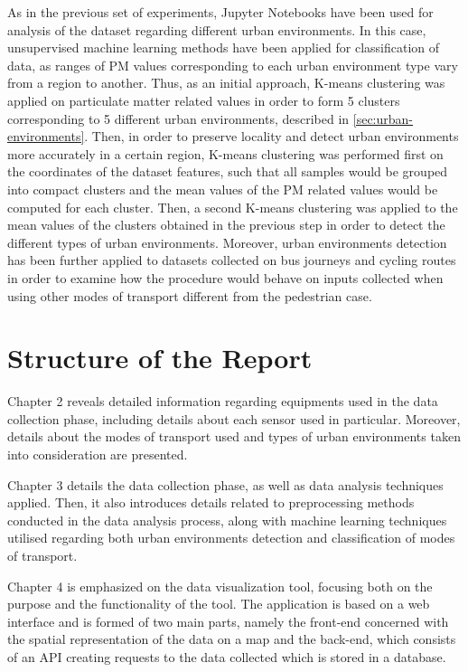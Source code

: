 \documentclass[bsc,frontabs,twoside,singlespacing, parskip,deptreport]{infthesis}     %
\begin{document}
As in the previous set of experiments, Jupyter Notebooks have been used for analysis of the dataset regarding different urban environments. In this case, unsupervised machine learning methods have been applied for classification of data, as ranges of PM values corresponding to each urban environment type vary from a region to another. Thus, as an initial approach, K-means clustering was applied on particulate matter related values in order to form 5 clusters corresponding to 5 different urban environments, described in \ref{sec:urban-environments}. Then, in order to preserve locality and detect urban environments more accurately in a certain region, K-means clustering was performed first on the coordinates of the dataset features, such that all samples would be grouped into compact clusters and the mean values of the PM related values would be computed for each cluster. Then, a second K-means clustering was applied to the mean values of the clusters obtained in the previous step in order to detect the different types of urban environments. Moreover, urban environments detection has been further applied to datasets collected on bus journeys and cycling routes in order to examine how the procedure would behave on inputs collected when using other modes of transport different from the pedestrian case.

\section{Structure of the Report}

Chapter 2 reveals detailed information regarding equipments used in the data collection phase, including details about each sensor used in particular. Moreover, details about the modes of transport used and types of urban environments taken into consideration are presented.

Chapter 3 details the data collection phase, as well as data analysis techniques applied. Then, it also introduces details related to preprocessing methods conducted in the data analysis process, along with machine learning techniques utilised regarding both urban environments detection and classification of modes of transport.

Chapter 4 is emphasized on the data visualization tool, focusing both on the purpose and the functionality of the tool. The application is based on a web interface and is formed of two main parts, namely the front-end concerned with the spatial representation of the data on a map and the back-end, which consists of an API creating requests to the data collected which is stored in a database.
\end{document}
